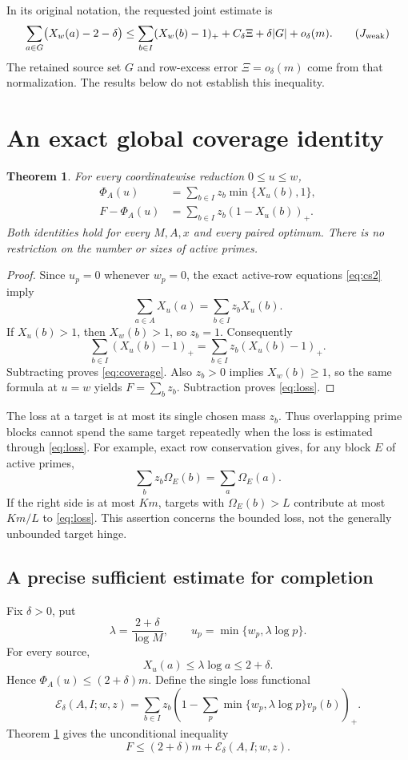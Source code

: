 \documentclass[11pt,a4paper]{article}
\newtheorem{theorem}{Theorem}[section]
\newcommand{\pos}[1]{(#1)_+}
\newcommand{\Ph}{\Phi}
\newcommand{\Om}{\Omega}
\begin{document}
In its original notation, the requested joint estimate is
\[
 \sum_{a\in G}\bigl(X_w(a)-2-\delta\bigr)
 \le \sum_{b\in I}\pos{X_w(b)-1}
       +C_\delta\Xi+\delta|G|+o_\delta(m).
 \tag{\(J_{\rm weak}\)}
\]
The retained source set \(G\) and row-excess error \(\Xi=o_\delta(m)\)
come from that normalization. The results below do not establish this
inequality.

\section{An exact global coverage identity}
\begin{theorem}\label{thm:coverage}
For every coordinatewise reduction \(0\le u\le w\),
\begin{align}
 \Ph_A(u)&=\sum_{b\in I}z_b\min\{X_u(b),1\}, \label{eq:coverage}\\
 F-\Ph_A(u)&=\sum_{b\in I}z_b\pos{1-X_u(b)}. \label{eq:loss}
\end{align}
Both identities hold for every \(M,A,x\) and every paired optimum.
There is no restriction on the number or sizes of active primes.
\end{theorem}
\begin{proof}
Since \(u_p=0\) whenever \(w_p=0\), the exact active-row equations
\eqref{eq:cs2} imply
\[
 \sum_{a\in A}X_u(a)=\sum_{b\in I}z_bX_u(b).
\]
If \(X_u(b)>1\), then \(X_w(b)>1\), so \(z_b=1\). Consequently
\[
 \sum_{b\in I}\pos{X_u(b)-1}
 =\sum_{b\in I}z_b\pos{X_u(b)-1}.
\]
Subtracting proves \eqref{eq:coverage}. Also \(z_b>0\) implies
\(X_w(b)\ge1\), so the same formula at \(u=w\) yields
\(F=\sum_bz_b\). Subtraction proves \eqref{eq:loss}.
\end{proof}

The loss at a target is at most its single chosen mass \(z_b\).
Thus overlapping prime blocks cannot spend the same target repeatedly
when the loss is estimated through \eqref{eq:loss}.
For example, exact row conservation gives, for any block \(E\) of active primes,
\[
 \sum_b z_b\Om_E(b)=\sum_a\Om_E(a).
\]
If the right side is at most \(Km\), targets with \(\Om_E(b)>L\)
contribute at most \(Km/L\) to \eqref{eq:loss}. This assertion concerns
the bounded loss, not the generally unbounded target hinge.

\subsection{A precise sufficient estimate for completion}
Fix \(\delta>0\), put
\[
 \lambda=\frac{2+\delta}{\log M},\qquad
 u_p=\min\{w_p,\lambda\log p\}.
 \label{eq:logcap}\tag{C}
\]
For every source,
\[
 X_u(a)\le\lambda\log a\le2+\delta.
\]
Hence \(\Ph_A(u)\le(2+\delta)m\). Define the single loss functional
\[
 \mathcal E_\delta(A,I;w,z)
   =\sum_{b\in I}z_b
       \left(1-\sum_p
          \min\{w_p,\lambda\log p\}v_p(b)\right)_+.
 \tag{L}
\]
Theorem \ref{thm:coverage} gives the unconditional inequality
\[
 \boxed{F\le(2+\delta)m+\mathcal E_\delta(A,I;w,z).}
 \tag{R}
\]
\end{document}
